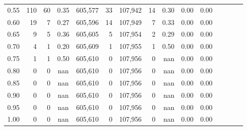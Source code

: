 \begin{tabular}{rrrcrrrrrrrrrrr}
0.55 &      110 &      60 &                                       0.35 &  605,577 &       33 &  107,942 &       14 &  0.30 &  0.00 &                         0.00 \\
0.60 &       19 &       7 &                                       0.27 &  605,596 &       14 &  107,949 &        7 &  0.33 &  0.00 &                         0.00 \\
0.65 &        9 &       5 &                                       0.36 &  605,605 &        5 &  107,954 &        2 &  0.29 &  0.00 &                         0.00 \\
0.70 &        4 &       1 &                                       0.20 &  605,609 &        1 &  107,955 &        1 &  0.50 &  0.00 &                         0.00 \\
0.75 &        1 &       1 &                                       0.50 &  605,610 &        0 &  107,956 &        0 &   nan &  0.00 &                         0.00 \\
0.80 &        0 &       0 &                                        nan &  605,610 &        0 &  107,956 &        0 &   nan &  0.00 &                         0.00 \\
0.85 &        0 &       0 &                                        nan &  605,610 &        0 &  107,956 &        0 &   nan &  0.00 &                         0.00 \\
0.90 &        0 &       0 &                                        nan &  605,610 &        0 &  107,956 &        0 &   nan &  0.00 &                         0.00 \\
0.95 &        0 &       0 &                                        nan &  605,610 &        0 &  107,956 &        0 &   nan &  0.00 &                         0.00 \\
1.00 &        0 &       0 &                                        nan &  605,610 &        0 &  107,956 &        0 &   nan &  0.00 &                         0.00 \\
\bottomrule
\end{tabular}
